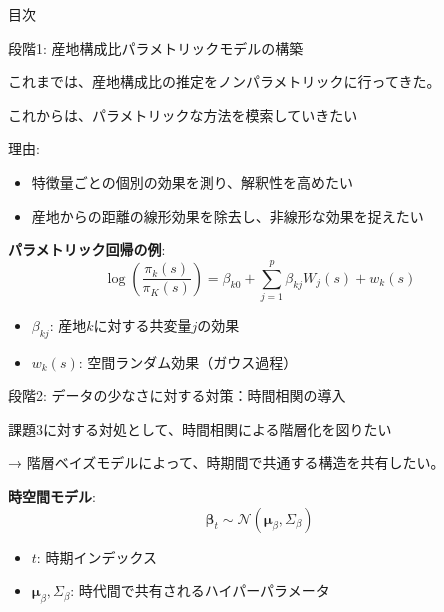 \documentclass[xelatex, 8pt]{beamer}
\theoremstyle{plain}
\theoremstyle{definition}
\begin{document}
\begin{frame}
{\Large 目次}
 \tableofcontents[currentsection]
\end{frame}

\begin{frame}{段階1: 産地構成比パラメトリックモデルの構築}

    これまでは、産地構成比の推定をノンパラメトリックに行ってきた。

    \vspace{2mm}

    これからは、パラメトリックな方法を模索していきたい

    \vspace{2mm}

    理由:
    \begin{itemize}
        \item 特徴量ごとの個別の効果を測り、解釈性を高めたい
        \item 産地からの距離の線形効果を除去し、非線形な効果を捉えたい
    \end{itemize}

    \vspace{5mm}

    \textbf{パラメトリック回帰の例}:
    $$\log\left(\frac{\pi_k(s)}{\pi_K(s)}\right) = \beta_{k0} + \sum_{j=1}^p \beta_{kj} W_j(s) + w_k(s)$$
    \begin{itemize}
        \item $\beta_{kj}$: 産地$k$に対する共変量$j$の効果
        \item $w_k(s)$: 空間ランダム効果（ガウス過程）
    \end{itemize}

    \vspace{5mm}

\end{frame}

\begin{frame}{段階2: データの少なさに対する対策：時間相関の導入}

    課題3に対する対処として、時間相関による階層化を図りたい

    \vspace{3mm}

    → 階層ベイズモデルによって、時期間で共通する構造を共有したい。
    \vspace{3mm}

    \textbf{時空間モデル}:
    $$\boldsymbol{\beta}_t \sim \mathcal{N}(\boldsymbol{\mu}_\beta, \Sigma_\beta)$$
    \begin{itemize}
        \item $t$: 時期インデックス
        \item $\boldsymbol{\mu}_\beta, \Sigma_\beta$: 時代間で共有されるハイパーパラメータ
    \end{itemize}

    \vspace{5mm}
\end{frame}
\end{document}
